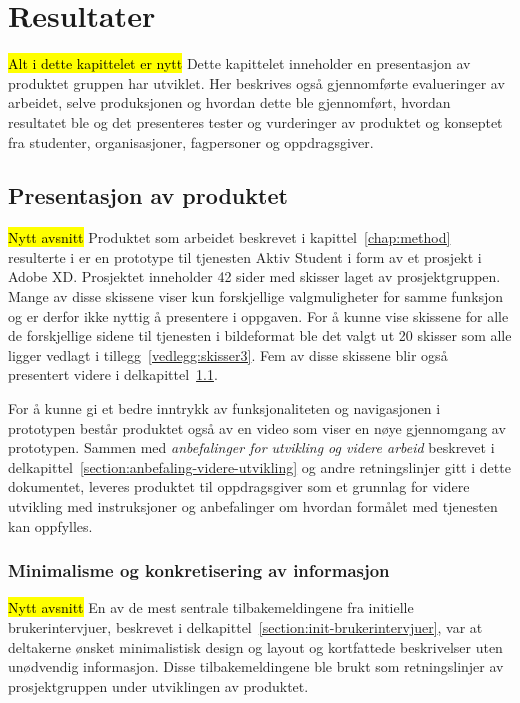 \cleardoublepage
\chapter{Resultater}
\label{chap:results} 

\hl{Alt i dette kapittelet er nytt}
Dette kapittelet inneholder en presentasjon av produktet gruppen har utviklet. Her beskrives også gjennomførte evalueringer av arbeidet, selve produksjonen og hvordan dette ble gjennomført, hvordan resultatet ble og det presenteres tester og vurderinger av produktet og konseptet fra studenter, organisasjoner, fagpersoner og oppdragsgiver.

\section{Presentasjon av produktet}
\label{section:presentasjon-produkt}
\hl{Nytt avsnitt}
Produktet som arbeidet beskrevet i kapittel~\ref{chap:method} resulterte i er en prototype til tjenesten Aktiv Student i form av et prosjekt i Adobe XD. Prosjektet inneholder 42 sider med skisser laget av prosjektgruppen. Mange av disse skissene viser kun forskjellige valgmuligheter for samme funksjon og er derfor ikke nyttig å presentere i oppgaven. For å kunne vise skissene for alle de forskjellige sidene til tjenesten i bildeformat ble det valgt ut 20 skisser som alle ligger vedlagt i tillegg~\ref{vedlegg:skisser3}. Fem av disse skissene blir også presentert videre i delkapittel~\ref{section:presentasjon-produkt}.

For å kunne gi et bedre inntrykk av funksjonaliteten og navigasjonen i prototypen består produktet også av en video som viser en nøye gjennomgang av prototypen. Sammen med {\em anbefalinger for utvikling og videre arbeid} beskrevet i delkapittel~\ref{section:anbefaling-videre-utvikling} og andre retningslinjer gitt i dette dokumentet, leveres produktet til oppdragsgiver som et grunnlag for videre utvikling med instruksjoner og anbefalinger om hvordan formålet med tjenesten kan oppfylles.

\subsection{Minimalisme og konkretisering av informasjon}
\hl{Nytt avsnitt}
En av de mest sentrale tilbakemeldingene fra initielle brukerintervjuer, beskrevet i delkapittel~\ref{section:init-brukerintervjuer}, var at deltakerne ønsket minimalistisk design og layout og kortfattede beskrivelser uten unødvendig informasjon. Disse tilbakemeldingene ble brukt som retningslinjer av prosjektgruppen under utviklingen av produktet. 

